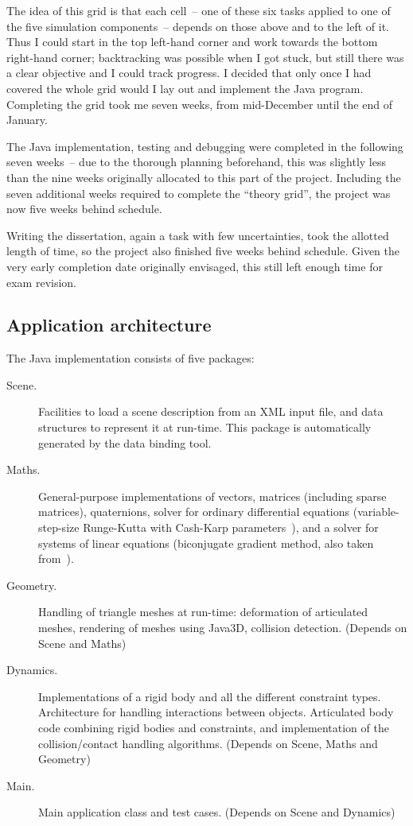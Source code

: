 The idea of this grid is that each cell~-- one of these six tasks applied to one of the five
simulation components~-- depends on those above and to the left of it. Thus I could start in the
top left-hand corner and work towards the bottom right-hand corner; backtracking was possible when
I got stuck, but still there was a clear objective and I could track progress. I decided that only
once I had covered the whole grid would I lay out and implement the Java program. Completing the
grid took me seven weeks, from mid-December until the end of January.

The Java implementation, testing and debugging were completed in the following seven weeks~-- due
to the thorough planning beforehand, this was slightly less than the nine weeks originally
allocated to this part of the project. Including the seven additional weeks required to complete
the ``theory grid'', the project was now five weeks behind schedule.

Writing the dissertation, again a task with few uncertainties, took the allotted length of time,
so the project also finished five weeks behind schedule. Given the very early completion date
originally envisaged, this still left enough time for exam revision.


\subsection{Application architecture}

The Java implementation consists of five packages:

\begin{description}
\item[Scene.] Facilities to load a scene description from an XML input file, and data structures
    to represent it at run-time. This package is automatically generated by the data binding tool.
\item[Maths.] General-purpose implementations of vectors, matrices (including sparse matrices),
    quaternions, solver for ordinary differential equations (variable-step-size Runge-Kutta with
    Cash-Karp parameters~\cite{NRinC}), and a solver for systems of linear equations (biconjugate
    gradient method, also taken from~\cite{NRinC}).
\item[Geometry.] Handling of triangle meshes at run-time: deformation of articulated meshes,
    rendering of meshes using Java3D, collision detection. (Depends on Scene and Maths)
\item[Dynamics.] Implementations of a rigid body and all the different constraint types.
    Architecture for handling interactions between objects. Articulated body code combining
    rigid bodies and constraints, and implementation of the collision/contact handling algorithms.
    (Depends on Scene, Maths and Geometry)
\item[Main.] Main application class and test cases. (Depends on Scene and Dynamics)
\end{description}

